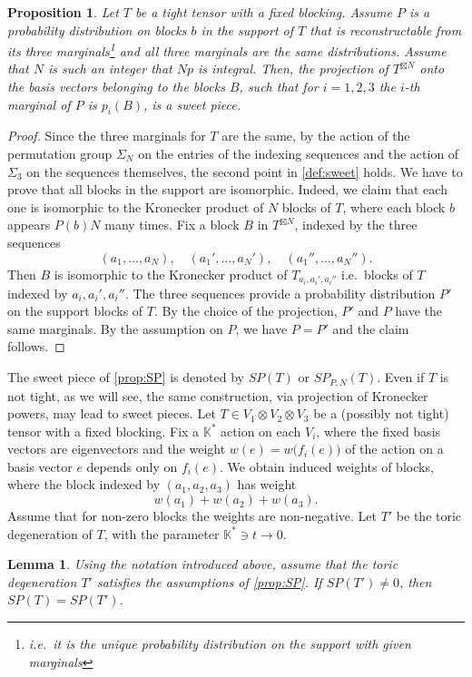 \documentclass[a4paper,11pt,reqno]{amsart}
\newcommand{\bbK}{\mathbb{K}}
\numberwithin{equation}{section}
\theoremstyle{definition}
\theoremstyle{plain}
\newtheorem{prop}[defn]{Proposition}
\newtheorem{lem}[defn]{Lemma}
\theoremstyle{remark}
\begin{document}
\begin{prop}\label{prop:SP}
Let $T$ be a tight tensor with a fixed blocking.
Assume $P$ is a probability distribution on blocks $b$ in the support of $T$ that is reconstructable from its three marginals\footnote{i.e.~it is the unique probability distribution on the support with given marginals} and all three marginals are the same distributions. Assume that $N$ is such an integer that $Np$ is integral.
Then, the projection of $T^{\boxtimes N}$ onto the basis vectors belonging to the blocks $B$, such that for $i=1,2,3$ the $i$-th marginal of $P$ is $p_i(B)$, is a sweet piece.
\end{prop}
\begin{proof}
Since the three marginals for $T$ are the same, by the action of the permutation
group $\Sigma_N$ on the entries of the indexing sequences and the action of
$\Sigma_3$ on the sequences themselves, the second point in  \autoref{def:sweet} holds. We have to prove that all blocks in the support are isomorphic. Indeed, we claim that each one is isomorphic to the Kronecker product of $N$ blocks of $T$, where each block $b$ appears $P(b)N$ many times.
Fix a block $B$ in $T^{\boxtimes N}$, indexed by the three sequences \[ (a_1,\dots,a_N),\quad (a_1',\dots,a_N'),\quad (a_1'',\dots,a_N'').\] Then $B$ is isomorphic to the Kronecker product of $T_{a_i,a_i',a_i''}$ i.e.~blocks of $T$ indexed by $a_i,a_i',a_i''$.
The three sequences provide a probability distribution $P'$ on the support blocks of $T$. By the choice of the projection, $P'$ and $P$ have the same marginals. By the assumption on $P$, we have $P=P'$ and the claim follows.
\end{proof}
The sweet piece of \autoref{prop:SP} is denoted by $SP(T)$ or $SP_{P,N}(T)$. Even if $T$ is not tight, as we will see, the same construction, via projection of Kronecker powers, may lead to sweet pieces.
Let $T\in V_1\otimes V_2\otimes V_3$ be a (possibly not tight) tensor with a
fixed blocking. Fix a $\bbK^*$ action on each $V_i$, where the fixed basis vectors are eigenvectors and the weight $w(e)=w\bigl(f_i(e)\bigr)$ of the action on a basis vector $e$ depends only on $f_i(e)$.
We obtain induced weights of blocks, where the block indexed by
$(a_1,a_2,a_3)$ has weight \[w(a_1)+w(a_2)+w(a_3).\] Assume that for non-zero
blocks the weights are non-negative. Let $T'$ be the toric degeneration of $T$,
with the parameter $\bbK^*\ni t\rightarrow 0$.
\begin{lem}\label{lem:samesweet}
Using the notation introduced above, assume that the toric degeneration $T'$ satisfies the assumptions of \autoref{prop:SP}. If $SP(T')\neq 0$, then $SP(T)=SP(T')$.
\end{lem}
\end{document}
